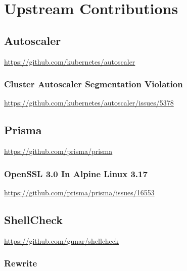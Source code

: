 \chapter{Upstream Contributions}
\label{cha:upstream_contributions}


\section{Autoscaler}
\label{sec:upstream_contributions_autoscaler}

\url{https://github.com/kubernetes/autoscaler}

\subsection{Cluster Autoscaler Segmentation Violation}
\label{subsec:upstream_contributions_autoscaler_cluster_autoscaler_segmentation_violation}

\url{https://github.com/kubernetes/autoscaler/issues/5378}

\section{Prisma}
\label{sec:upstream_contributions_prisma}

\url{https://github.com/prisma/prisma}

\subsection{OpenSSL 3.0 In Alpine Linux 3.17}
\label{subsec:upstream_contributions_prisma_openssl_in_alpine_linux}

\url{https://github.com/prisma/prisma/issues/16553}

\section{ShellCheck}
\label{sec:upstream_contributions_shellcheck}

\url{https://github.com/gunar/shellcheck}

\subsection{Rewrite}
\label{subsec:upstream_contributions_shellcheck_rewrite}


